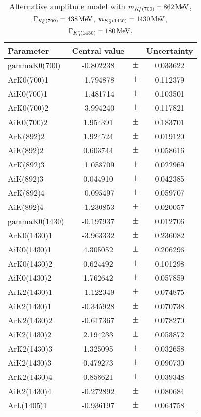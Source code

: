 \clearpage

\begin{table}
\centering
\caption{Alternative amplitude model with $m_{K^*_0(700)} = 862 \text{\,Me\kern -0.1em V}$, $\Gamma_{K^*_0(700)} = 438 \text{\,Me\kern -0.1em V}$, $m_{K^*_0(1430)} = 1430 \text{\,Me\kern -0.1em V}$, $\Gamma_{K^*_0(1430)} = 180 \text{\,Me\kern -0.1em V}$.}
\begin{tiny}
\begin{tabular}{lccc}
\toprule
Parameter & Central value & & Uncertainty\\
\midrule
gammaK0(700) & -0.802238 & $\pm$ & 0.033622 \\
ArK0(700)1 & -1.794878 & $\pm$ & 0.112379 \\
AiK0(700)1 & -1.481714 & $\pm$ & 0.103501 \\
ArK0(700)2 & -3.994240 & $\pm$ & 0.117821 \\
AiK0(700)2 & 1.954391 & $\pm$ & 0.183701 \\
ArK(892)2 & 1.924524 & $\pm$ & 0.019120 \\
AiK(892)2 & 0.603744 & $\pm$ & 0.058616 \\
ArK(892)3 & -1.058709 & $\pm$ & 0.022969 \\
AiK(892)3 & 0.044910 & $\pm$ & 0.042385 \\
ArK(892)4 & -0.095497 & $\pm$ & 0.059707 \\
AiK(892)4 & -1.230853 & $\pm$ & 0.020057 \\
gammaK0(1430) & -0.197937 & $\pm$ & 0.012706 \\
ArK0(1430)1 & -3.963332 & $\pm$ & 0.236082 \\
AiK0(1430)1 & 4.305052 & $\pm$ & 0.206296 \\
ArK0(1430)2 & 0.624492 & $\pm$ & 0.101298 \\
AiK0(1430)2 & 1.762642 & $\pm$ & 0.057859 \\
ArK2(1430)1 & -1.122349 & $\pm$ & 0.074875 \\
AiK2(1430)1 & -0.345928 & $\pm$ & 0.070738 \\
ArK2(1430)2 & -0.617367 & $\pm$ & 0.078270 \\
AiK2(1430)2 & 2.194233 & $\pm$ & 0.053872 \\
ArK2(1430)3 & 1.325095 & $\pm$ & 0.032658 \\
AiK2(1430)3 & 0.479273 & $\pm$ & 0.090730 \\
ArK2(1430)4 & 0.858621 & $\pm$ & 0.039348 \\
AiK2(1430)4 & -0.272892 & $\pm$ & 0.080684 \\
ArL(1405)1 & -0.936197 & $\pm$ & 0.064758 \\

\end{tabular}
\end{tiny}
\end{table}
